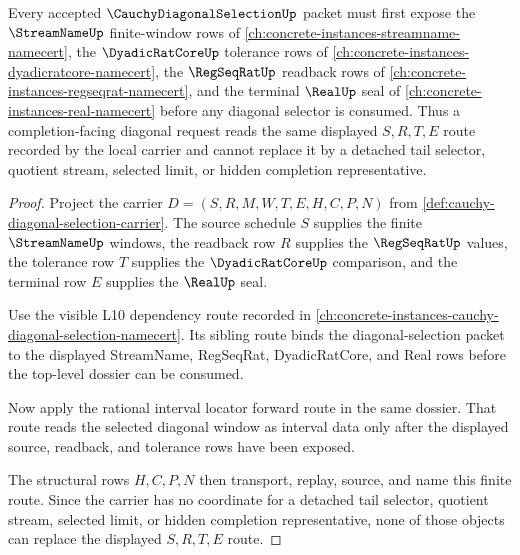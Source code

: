 \begin{theorem}
\label{thm:cauchy-diagonal-selection-streamname-regseqrat-route}
Every accepted $\CauchyDiagonalSelectionUp$ packet must first expose the $\StreamNameUp$ finite-window rows of \autoref{ch:concrete-instances-streamname-namecert}, the $\DyadicRatCoreUp$ tolerance rows of \autoref{ch:concrete-instances-dyadicratcore-namecert}, the $\RegSeqRatUp$ readback rows of \autoref{ch:concrete-instances-regseqrat-namecert}, and the terminal $\RealUp$ seal of \autoref{ch:concrete-instances-real-namecert} before any diagonal selector is consumed. Thus a completion-facing diagonal request reads the same displayed $S,R,T,E$ route recorded by the local carrier and cannot replace it by a detached tail selector, quotient stream, selected limit, or hidden completion representative.
\end{theorem}
\begin{proof}
Project the carrier $D=(S,R,M,W,T,E,H,C,P,N)$ from \autoref{def:cauchy-diagonal-selection-carrier}. The source schedule $S$ supplies the finite $\StreamNameUp$ windows, the readback row $R$ supplies the $\RegSeqRatUp$ values, the tolerance row $T$ supplies the $\DyadicRatCoreUp$ comparison, and the terminal row $E$ supplies the $\RealUp$ seal.

Use the visible L10 dependency route recorded in \autoref{ch:concrete-instances-cauchy-diagonal-selection-namecert}. Its sibling route binds the diagonal-selection packet to the displayed StreamName, RegSeqRat, DyadicRatCore, and Real rows before the top-level dossier can be consumed.

Now apply the rational interval locator forward route in the same dossier. That route reads the selected diagonal window as interval data only after the displayed source, readback, and tolerance rows have been exposed.

The structural rows $H,C,P,N$ then transport, replay, source, and name this finite route. Since the carrier has no coordinate for a detached tail selector, quotient stream, selected limit, or hidden completion representative, none of those objects can replace the displayed $S,R,T,E$ route.
\end{proof}

